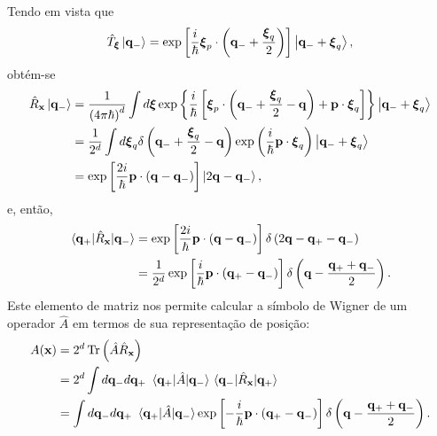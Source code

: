 \documentclass[
	12pt,
	oneside,			%
	a4paper,			%
	english,			%
	brazil				%
	]{abntex2}
\theoremstyle{definition}
\begin{document}
Tendo em vista que
\begin{equation}
    \hat{T}_{\boldsymbol{\xi}} \ket{\mathbf{q}_{-}} = \exp \left[\frac{i}{\hbar} \boldsymbol{\xi}_p \cdot \left( \mathbf{q}_- + \frac{\boldsymbol{\xi}_q}{2} \right) \right] \ket{\mathbf{q}_- + \boldsymbol{\xi}_q},
\end{equation}
obtém-se
\begin{equation}
    \begin{aligned}
        \hat{R}_\mathbf{x} \ket{\mathbf{q}_-} &= \frac{1}{\left(4\pi \hbar\right)^d} \int d \boldsymbol{\xi} \exp \left\{\frac{i}{\hbar} \left[\boldsymbol{\xi}_p \cdot\left( \mathbf{q}_- + \frac{\boldsymbol{\xi}_q}{2} -\mathbf{q}\right) + \mathbf{p} \cdot \boldsymbol{\xi}_q \right] \right\} \ket{\mathbf{q}_- + \boldsymbol{\xi}_q} \\
        &= \frac{1}{2^d} \int d \boldsymbol{\xi}_q \delta\left( \mathbf{q}_- + \frac{\boldsymbol{\xi}_q}{2} -\mathbf{q}\right) \exp \left( \frac{i}{\hbar} \mathbf{p} \cdot \boldsymbol{\xi}_q \right) \ket{\mathbf{q}_-+\boldsymbol{\xi}_q} \\
        &= \exp \left[ \frac{2i}{\hbar} \mathbf{p} \cdot \left(\mathbf{q}-\mathbf{q}_-\right) \right] \ket{2\mathbf{q}-\mathbf{q}_-},
    \end{aligned}
\end{equation}
e, então,
\begin{equation}
    \begin{aligned}
        \mel{\mathbf{q}_+}{\hat{R}_\mathbf{x}}{\mathbf{q}_-} &= \exp \left[ \frac{2i}{\hbar} \mathbf{p} \cdot \left(\mathbf{q}-\mathbf{q}_-\right) \right] \delta \left(2\mathbf{q}-\mathbf{q}_+-\mathbf{q}_-\right) \\
        &= \frac{1}{2^d} \exp \left[ \frac{i}{\hbar} \mathbf{p} \cdot \left(\mathbf{q}_+-\mathbf{q}_-\right) \right] \delta \left(\mathbf{q}-\frac{\mathbf{q}_++\mathbf{q}_-}{2}\right).
    \end{aligned}
\end{equation}
Este elemento de matriz nos permite calcular a símbolo de Wigner de um operador $\hat{A}$ em termos de sua representação de posição:
\begin{equation}
    \begin{aligned}
        A(\mathbf{x}) &= 2^d \Tr \left(\hat{A}\hat{R}_\mathbf{x}\right) \\ &= 2^d \int d\mathbf{q}_- d\mathbf{q}_+ \ \mel{\mathbf{q}_+}{\hat{A}}{\mathbf{q}_-} \mel{\mathbf{q}_-}{\hat{R}_\mathbf{x}}{\mathbf{q}_+} \\
        & =  \int d\mathbf{q}_- d\mathbf{q}_+ \ \mel{\mathbf{q}_+}{\hat{A}}{\mathbf{q}_-} \exp \left[ -\frac{i}{\hbar} \mathbf{p} \cdot \left(\mathbf{q}_+-\mathbf{q}_-\right) \right] \delta \left(\mathbf{q}-\frac{\mathbf{q}_++\mathbf{q}_-}{2}\right).
    \end{aligned}
\end{equation}
\end{document}
